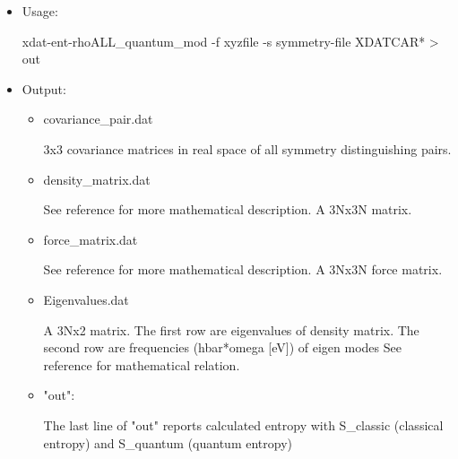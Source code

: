 \documentclass[11pt]{article}
\begin{document}
\begin{itemize}
\item Usage:

xdat-ent-rhoALL\_quantum\_mod -f xyzfile -s symmetry-file XDATCAR* > out

\item Output:

\begin{itemize}
\item covariance\_pair.dat

3x3 covariance matrices in real space of all symmetry distinguishing
pairs.

\item density\_matrix.dat

See reference for more mathematical description.
A 3Nx3N matrix.

\item force\_matrix.dat

See reference for more mathematical description.
A 3Nx3N force matrix.

\item Eigenvalues.dat

A 3Nx2 matrix.
The first row are eigenvalues of density matrix.
The second row are frequencies (hbar*omega [eV]) of eigen modes
See reference for mathematical relation.

\item "out":

The last line of "out" reports calculated entropy with S\_classic
(classical entropy) and S\_quantum (quantum entropy)
\end{itemize}
\end{itemize}
\end{document}
